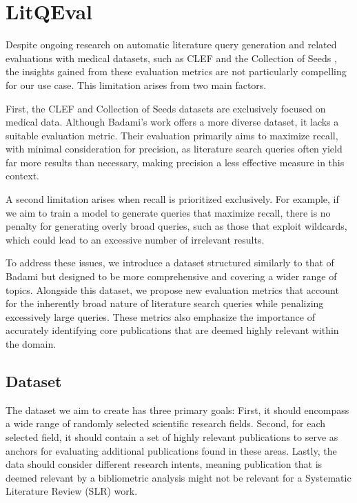 \chapter{LitQEval}\label{ch:ownApproach}
Despite ongoing research on automatic literature query generation and related evaluations with medical datasets, such as CLEF \autocite{kanoulas2017clef, kanoulas2018clef, kanoulas2019clef} and the Collection of Seeds \autocite{Wang_2022}, the insights gained from these evaluation metrics are not particularly compelling for our use case. This limitation arises from two main factors. 

First, the CLEF and Collection of Seeds datasets are exclusively focused on medical data. Although Badami's work \autocite{badami2023adaptive} offers a more diverse dataset, it lacks a suitable evaluation metric. Their evaluation primarily aims to maximize recall, with minimal consideration for precision, as literature search queries often yield far more results than necessary, making precision a less effective measure in this context. 

A second limitation arises when recall is prioritized exclusively. For example, if we aim to train a model to generate queries that maximize recall, there is no penalty for generating overly broad queries, such as those that exploit wildcards, which could lead to an excessive number of irrelevant results.

To address these issues, we introduce a dataset structured similarly to that of Badami \autocite{badami2023adaptive} but designed to be more comprehensive and covering a wider range of topics. Alongside this dataset, we propose new evaluation metrics that account for the inherently broad nature of literature search queries while penalizing excessively large queries. These metrics also emphasize the importance of accurately identifying core publications that are deemed highly relevant within the domain.


\section{Dataset}
The dataset we aim to create has three primary goals: First, it should encompass a wide range of randomly selected scientific research fields. Second, for each selected field, it should contain a set of highly relevant publications to serve as anchors for evaluating additional publications found in these areas. Lastly, the data should consider different research intents, meaning publication that is deemed relevant by a bibliometric analysis might not be relevant for a Systematic Literature Review (SLR) work.

